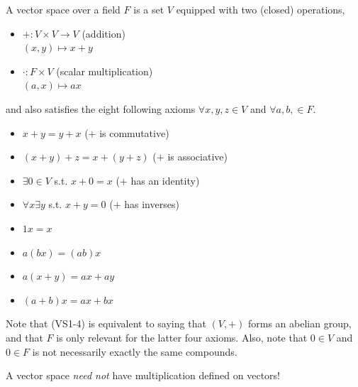 \documentclass[12pt]{article}
\begin{document}
\begin{defn}
    A vector space over a field $F$ is a set $V$ equipped with two (closed) operations,
    \begin{itemize}
        \item $+: V \times V \to V $ (addition) \\ $(x,y) \mapsto x+y$
        \item $\cdot: F \times V$ (scalar multiplication) \\ $(a,x) \mapsto ax$
    \end{itemize}
    and also satisfies the eight following axioms $\forall x,y,z \in V$ and $\forall a,b, \in F$.
    \begin{itemize}
        \item[(VS1)] $x+y=y+x$ \hfill ($+$ is commutative)
        \item[(VS2)] $(x+y)+z = x+(y+z)$ \hfill ($+$ is associative)
        \item[(VS3)] $\exists 0 \in V$ s.t. $x+0=x$ \hfill ($+$ has an identity)
        \item[(VS4)] $\forall x \exists y$ s.t. $x+y=0$ \hfill ($+$ has inverses)
        \item[(VS5)] $1x = x$
        \item[(VS6)] $a(bx) = (ab)x$
        \item[(VS7)] $a(x+y) = ax + ay$
        \item[(VS8)] $(a+b)x = ax + bx$
    \end{itemize}
\end{defn}
\begin{remark}
    Note that (VS1-4) is equivalent to saying that $(V, +)$ forms an abelian group, and that $F$ is only relevant for the latter four axioms. Also, note that $0 \in V$ and $0 \in F$ is not necessarily exactly the same compounds.
\end{remark}
\begin{remark}
    A vector space \textit{need not} have multiplication defined on vectors!
\end{remark}
\end{document}
